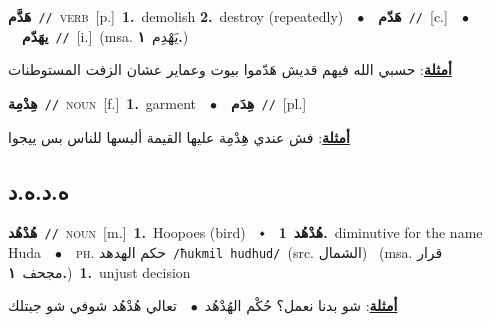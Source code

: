 \documentclass[10pt,a4paper,twoside]{article} %
\begin{document}
\begin{multicols}{2}
{\setlength\topsep{0pt}\textbf{\foreignlanguage{arabic}{هَدَّم}}\ {\color{gray}\texttt{//}\color{black}}\ \textsc{verb}\ [p.]\ \textbf{1.}~demolish  \textbf{2.}~destroy (repeatedly)\ \ $\bullet$\ \ \setlength\topsep{0pt}\textbf{\foreignlanguage{arabic}{هَدّم}}\ {\color{gray}\texttt{//}\color{black}}\ [c.]\ \ $\bullet$\ \ \setlength\topsep{0pt}\textbf{\foreignlanguage{arabic}{يهَدّم}}\ {\color{gray}\texttt{//}\color{black}}\ [i.]\ \color{gray}(msa. \foreignlanguage{arabic}{يَهْدِم}~\foreignlanguage{arabic}{\textbf{١.}})\color{black}\  \begin{flushright}\color{gray}\foreignlanguage{arabic}{\textbf{\underline{\foreignlanguage{arabic}{أمثلة}}}: حسبي الله فيهم قديش هَدّموا بيوت وعماير عشان الزفت المستوطنات}\end{flushright}\color{black}} \vspace{2mm}

{\setlength\topsep{0pt}\textbf{\foreignlanguage{arabic}{هِدْمِة}}\ {\color{gray}\texttt{//}\color{black}}\ \textsc{noun}\ [f.]\ \textbf{1.}~garment\ \ $\bullet$\ \ \setlength\topsep{0pt}\textbf{\foreignlanguage{arabic}{هِدَم}}\ {\color{gray}\texttt{//}\color{black}}\ [pl.]\  \begin{flushright}\color{gray}\foreignlanguage{arabic}{\textbf{\underline{\foreignlanguage{arabic}{أمثلة}}}: فش عندي هِدْمِة عليها القيمة ألبسها للناس بس ييجوا}\end{flushright}\color{black}} \vspace{2mm}

\vspace{-3mm}
\subsection*{\color{blue}\foreignlanguage{arabic}{ه.د.ه.د}\color{blue}{}} 

{\setlength\topsep{0pt}\textbf{\foreignlanguage{arabic}{هُدْهُد}}\ {\color{gray}\texttt{//}\color{black}}\ \textsc{noun}\ [m.]\ \textbf{1.}~Hoopoes (bird)\ \ $\smblkdiamond$\ \ \setlength\topsep{0pt}\textbf{\foreignlanguage{arabic}{هُدْهُد}}\ \textbf{1.}~diminutive for the name Huda\ \ $\bullet$\ \ \textsc{ph.} \color{gray} \foreignlanguage{arabic}{حكم الهدهد}\color{black}\ {\color{gray}\texttt{/{\sffamily ħukmil hudhud}/}\color{black}}\ \color{gray}(src. \foreignlanguage{arabic}{الشمال})\color{black}\ \color{gray} (msa. \foreignlanguage{arabic}{قرار مجحف}~\foreignlanguage{arabic}{\textbf{١.}})\color{black}\ \textbf{1.}~unjust decision\  \begin{flushright}\color{gray}\foreignlanguage{arabic}{\textbf{\underline{\foreignlanguage{arabic}{أمثلة}}}: شو بدنا نعمل؟ حُكْم الهُدْهُد\ $\bullet$\ \  تعالي هُدْهُد شوفي شو جبتلك}\end{flushright}\color{black}} \vspace{2mm}


\end{multicols}
\end{document}
